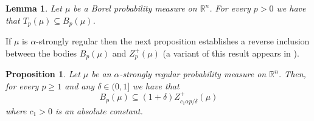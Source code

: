 \documentclass[11pt,leqno]{article}
\newtheorem{lemma}[theorem]{Lemma}
\newtheorem{proposition}[theorem]{Proposition}
\theoremstyle{definition}
\theoremstyle{remark}
\numberwithin{equation}{section}
\newcommand{\gr}{\geqslant}
\newcommand{\1}{\textbf{1}}
\begin{document}
\begin{lemma}\label{lem:standard}Let $\mu$ be a Borel probability measure on $\mathbb R^n$.
For every $p>0$ we have that $T_p(\mu)\subseteq B_p(\mu)$.\end{lemma}

If $\mu$ is $\alpha $-strongly regular then the next proposition establishes a reverse inclusion between the bodies
$B_p(\mu )$ and $Z_p^+(\mu )$ (a variant of this result appears in \cite[Proposition~3.5]{Latala-Wojtaszczyk-2008}).

\begin{proposition}\label{prop:B<Z}Let $\mu $ be an $\alpha$-strongly regular probability measure on $\mathbb{R}^n$.
Then, for every $p\gr 1$ and any $\delta \in (0,1]$ we have that
\begin{equation*}B_p(\mu) \subseteq (1+\delta)Z_{c_1\alpha p/\delta}^+(\mu)\end{equation*}
where $c_1>0$ is an absolute constant.
\end{proposition}
\end{document}

